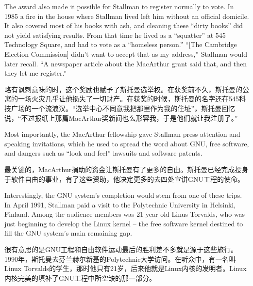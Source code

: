 \ifdefined\eng
The award also made it possible for Stallman to register normally to vote. In 1985 a fire in the house where Stallman lived left him without an official domicile.  It also covered most of his books with ash, and cleaning these ``dirty books'' did not yield satisfying results. From that time he lived as a ``squatter'' at 545 Technology Square, and had to vote as a ``homeless person.'' ``[The Cambridge Election Commission] didn't want to accept that as my address,'' Stallman would later recall. ``A newspaper article about the MacArthur grant said that, and then they let me register.''
\fi

\ifdefined\chs

略有讽刺意味的时，这个奖励也赋予了斯托曼选举权。在获奖前不久，斯托曼的公寓的一场火灾几乎让他损失了一切财产。在获奖的时候，斯托曼的名字还在545科技广场的一个流浪汉。“选举中心不同意我把那里作为我的住址”，斯托曼回忆说，“不过报纸上那篇MacArthur奖新闻也么形容我，于是他们就让我注册了。”
\fi

\ifdefined\eng
Most importantly, the MacArthur fellowship gave Stallman press attention and speaking invitations, which he used to spread the word about GNU, free software, and dangers such as ``look and feel'' lawsuits and software patents.
\fi

\ifdefined\chs
最关键的，MacArthur捐助的资金让斯托曼有了更多的自由。斯托曼已经完成投身于软件自由的事业，有了这些资助，他决定更多的去四处宣讲GNU工程的使命。
\fi

\ifdefined\eng
Interestingly, the GNU system's completion would stem from one of these trips. In April 1991, Stallman paid a visit to the Polytechnic University in Helsinki, Finland. Among the audience members was 21-year-old Linus Torvalds, who was just beginning to develop the Linux kernel -- the free software kernel destined to fill the GNU system's main remaining gap.
\fi

\ifdefined\chs
很有意思的是GNU工程和自由软件运动最后的胜利差不多就是源于这些旅行。1990年，斯托曼去芬兰赫尔新基的Polytechnic大学访问。在听众中，有一名叫Linux Torvalds的学生，那时他只有21岁，后来他就是Linux内核的发明者。Linux内核完美的填补了GNU工程中所空缺的那一部分。
\fi

